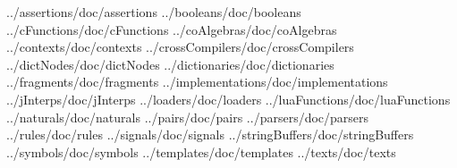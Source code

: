 

\diSimpComponent ../assertions/doc/assertions
\diSimpComponent ../booleans/doc/booleans
\diSimpComponent ../cFunctions/doc/cFunctions
\diSimpComponent ../coAlgebras/doc/coAlgebras
\diSimpComponent ../contexts/doc/contexts
\diSimpComponent ../crossCompilers/doc/crossCompilers
\diSimpComponent ../dictNodes/doc/dictNodes
\diSimpComponent ../dictionaries/doc/dictionaries
\diSimpComponent ../fragments/doc/fragments
\diSimpComponent ../implementations/doc/implementations
\diSimpComponent ../jInterps/doc/jInterps
\diSimpComponent ../loaders/doc/loaders
\diSimpComponent ../luaFunctions/doc/luaFunctions
\diSimpComponent ../naturals/doc/naturals
\diSimpComponent ../pairs/doc/pairs
\diSimpComponent ../parsers/doc/parsers
\diSimpComponent ../rules/doc/rules
\diSimpComponent ../signals/doc/signals
\diSimpComponent ../stringBuffers/doc/stringBuffers
\diSimpComponent ../symbols/doc/symbols
\diSimpComponent ../templates/doc/templates
\diSimpComponent ../texts/doc/texts
  

